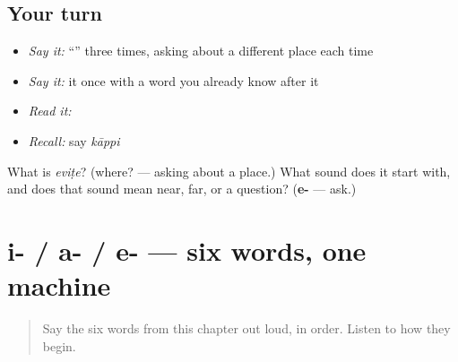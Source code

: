 \subsection*{Your turn}
\begin{itemize}
\raggedright
  \item \emph{Say it:} \textquotedblleft{}\textquotedblright{} three times, asking about a different place each time
  \item \emph{Say it:} it once with a word you already know after it
  \item \emph{Read it:} \textbf{}
  \item \emph{Recall:} say \emph{kāppi}
\end{itemize}

\begin{tcolorbox}[breakable,colback=teal!4,colframe=teal!35!black,title={Before you move on}]
What is \emph{eviṭe}? (where? — asking about a place.) What sound does it start with, and does that sound mean near, far, or a question? (\textbf{e-} — ask.)
\end{tcolorbox}
\section[i- / a- / e-]{i- / a- / e- — six words, one machine}

\label{lesson:ML-C41-deixis-system}



\begin{quote}
Say the six words from this chapter out loud, in order. Listen to how they begin.
\end{quote}


